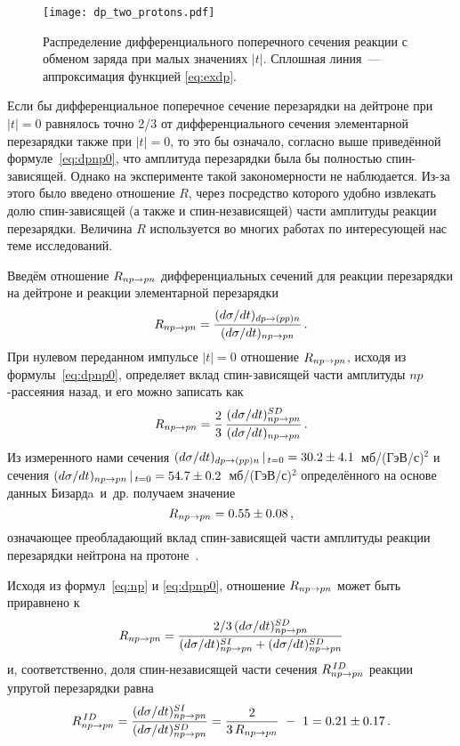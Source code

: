 \begin{figure}[h]
  \centering
  \texttt{[image: dp\_two\_protons.pdf]}
  \caption{Распределение дифференциального поперечного сечения реакции с обменом
    заряда \dpchex при малых значениях $|t|$. Сплошная линия~--- аппроксимация
    функцией \eqref{eq:exdp}.}
  \label{fig:dp_two_protons}
\end{figure}

Если бы дифференциальное поперечное сечение перезарядки на дейтроне при $|t|=0$
равнялось точно 2/3 от дифференциального сечения элементарной \np перезарядки
также при $|t|=0$, то это бы означало, согласно выше приведённой
формуле~\eqref{eq:dpnp0}, что амплитуда перезарядки была бы полностью
спин-зависящей. Однако на эксперименте такой закономерности не наблюдается.
Из-за этого было введено отношение $R$, через посредство которого удобно
извлекать долю спин-зависящей (а также и спин-независящей) части амплитуды
реакции \np перезарядки. Величина $R$ используется во многих работах по
интересующей нас теме исследований.

Введём отношение $R_{np \rightarrow pn}$ дифференциальных сечений для реакции перезарядки на
дейтроне \dpchex и реакции элементарной перезарядки \np
\begin{equation}
  R_{np \rightarrow pn} = \frac{(d\sigma/dt)_{dp \rightarrow (pp)n}}{(d\sigma/dt)_{np \rightarrow pn}}\,.
\end{equation}
При нулевом переданном импульсе $|t|=0$ отношение $R_{np \rightarrow pn}$, исходя из
формулы~\eqref{eq:dpnp0}, определяет вклад спин-зависящей части амплитуды
$np$-рассеяния назад, и его можно записать как
\begin{equation}
  R_{np \rightarrow pn} = \frac{2}{3}\,\frac{(d\sigma/dt)^{SD}_{np \rightarrow pn}}{(d\sigma/dt)_{np \rightarrow pn}}\,.
\end{equation}
Из измеренного нами сечения $(d\sigma/dt)_{dp \rightarrow (pp)n}\,|\,_{t=0} = 30.2 \pm
4.1$~мб/(ГэВ/с)$^{2}$ и сечения $(d\sigma/dt)_{np \rightarrow pn}\,|\,_{t=0} = 54.7 \pm
0.2$~мб/(ГэВ/с)$^{2}$ определённого на основе данных Бизардa~и~др. получаем
значение
\begin{equation}
  R_{np \rightarrow pn} = 0.55 \pm 0.08\,,
\end{equation}
означающее преобладающий вклад спин-зависящей части амплитуды реакции
перезарядки нейтрона на протоне~\cite{gla_mucha08}.

Исходя из формул~\eqref{eq:np} и \eqref{eq:dpnp0}, отношение $R_{np \rightarrow pn}$ может
быть приравнено к
\begin{equation}
  R_{np \rightarrow pn} = \frac{2/3\,(d\sigma/dt)^{SD}_{np \rightarrow pn}}
  {(d\sigma/dt)^{SI}_{np \rightarrow pn} + (d\sigma/dt)^{SD}_{np \rightarrow pn}}
\end{equation}
и, соответственно, доля спин-независящей части сечения $R^{\,ID}_{np \rightarrow pn}$ реакции
упругой \np перезарядки равна
\begin{equation}
  R^{\,ID}_{np \rightarrow pn} = \frac{(d\sigma/dt)^{SI}_{np \rightarrow pn}}{(d\sigma/dt)^{SD}_{np \rightarrow pn}} =
  \frac{2}{3\,R_{np \rightarrow pn}} \ - \ 1 = 0.21 \pm 0.17\,.
\end{equation}

